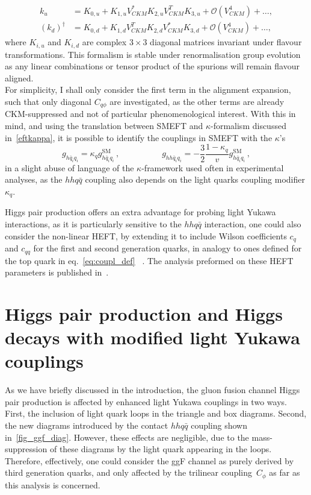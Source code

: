  \begin{align}
 	k_u &= K_{0,u}+ K_{1,u} V^*_{CKM} K_{2,u} V^T_{CKM} K_{3,u} + \mathcal O(V^4_{CKM})+ \dots,  \\
 	(k_d)^\dagger&=K_{0,d}+ K_{1,d} V^T_{CKM} K_{2,d} V^*_{CKM} K_{3,d} + \mathcal O(V^4_{CKM}) + \dots,
 	\label{eqK}
 \end{align}
 where $K_{i,u}$ and $K_{i,d}$ are complex $3\times3$ diagonal matrices invariant under flavour transformations. This formalism is stable under renormalisation group evolution as any linear combinations or tensor product of the spurions will remain flavour aligned. \\
 For simplicity, I shall only consider the first term in the alignment expansion, such that only diagonal $C_{q\phi}$ are investigated, as the other terms are already CKM-suppressed and not of particular phenomenological interest.  With this in mind, and using the translation between SMEFT and $\kappa$-formalism discussed in~\autoref{eftkappa}, it is possible to identify the couplings in SMEFT with the $\kappa$'s
\begin{equation}
	g_{h\bar{q}_i q_i} =\kappa_q g_{h\bar{q}_i q_i}^{\text{SM}} \,, \quad \quad \quad \quad \quad g_{h h\bar{q}_i q_i}= - \frac{3}{2}\frac{1-\kappa_q}{v}g_{h\bar{q}_i q_i}^{\text{SM}} \,,
	\label{eq:def_kappa}
\end{equation}
in a slight abuse of language of the $\kappa$-framework used often in experimental analyses, as the $hhq \bar q$ coupling also depends on the light quarks coupling modifier $\kappa_q$. 
\par
Higgs pair production offers an extra advantage for probing light Yukawa interactions, as it is particularly sensitive to the $hh q\bar q$ interaction, one could also consider the non-linear HEFT, by extending it to include Wilson coefficients $c_q$ and $c_{qq}$ for the first and second generation quarks, in analogy to ones defined for the top quark in eq.~\eqref{eq:coupl_def}~ \cite{Contino:2010mh}. The analysis preformed on these HEFT parameters is published in~\cite{Alasfar:2019pmn}. 
\section{Higgs pair production and Higgs decays with modified light Yukawa couplings \label{sec:qqHH}}
As we have briefly discussed in the introduction, the gluon fusion channel Higgs pair production is affected by enhanced light Yukawa couplings in two ways. First, the inclusion of light quark loops in the triangle and box diagrams. Second, the new diagrams introduced by the contact $hh q\bar q$ coupling shown in~\autoref{fig_ggf_diag}. However, these effects are negligible, due to the mass-suppression of these diagrams by the light quark appearing in the loops. Therefore, effectively, one could consider the ggF channel as purely derived by third generation quarks, and only affected by the trilinear coupling~$C_\phi$ as far as this analysis is concerned.

